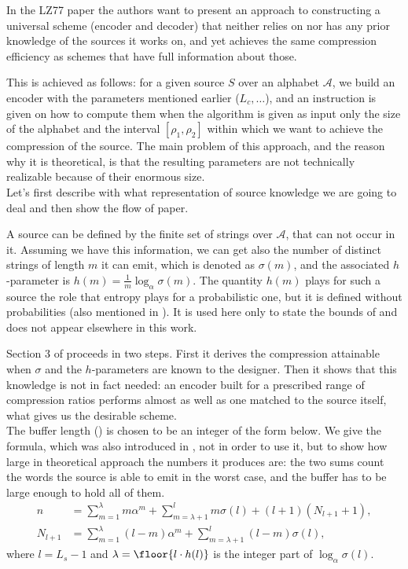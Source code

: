 In the LZ77 paper the authors want to present an approach to constructing a universal scheme (encoder and decoder) that neither relies on nor has any prior knowledge of the sources it works on, and yet achieves the same compression efficiency as schemes that have full information about those.

This is achieved as follows: for a given source \(S\) over an alphabet \(\mathcal{A}\), we build an encoder with the parameters mentioned earlier (\(L_c, \ldots\)), and an instruction is given on how to compute them when the algorithm is given as input only the size of the alphabet and the interval \([\rho_1, \rho_2]\) within which we want to achieve the compression of the source. The main problem of this approach, and the reason why it is theoretical, is that the resulting parameters are not technically realizable because of their enormous size.
\\

Let's first describe with what representation of source knowledge we are going to deal and then show the flow of \cite{ziv1977} paper.

A source can be defined by the finite set of strings over \(\mathcal{A}\), that can not occur in it. Assuming we have this information, we can get also the number of distinct strings of length \(m\) it can emit, which is denoted as \(\sigma(m)\), and the associated \(h\)-parameter is \(h(m) = \tfrac{1}{m} \log_\alpha \sigma(m)\). The quantity \(h(m)\) plays for such a source the role that entropy plays for a probabilistic one, but it is defined without probabilities (also mentioned in \cite{ziv1977}). It is used here only to state the bounds of \cite{ziv1977} and does not appear elsewhere in this work.

Section 3 of \cite{ziv1977} proceeds in two steps. First it derives the compression attainable when \(\sigma\) and the \(h\)-parameters are known to the designer. Then it shows that this knowledge is not in fact needed: an encoder built for a prescribed range of compression ratios performs almost as well as one matched to the source itself, what gives us the desirable scheme.
\\

The buffer length () is chosen to be an integer of the form below. We give the formula, which was also introduced in \cite{ziv1977}, not in order to use it, but to show how large in theoretical approach the numbers it produces are: the two sums count the words the source is able to emit in the worst case, and the buffer has to be large enough to hold all of them.
\begin{align}
\label{eq:buffer-length}
    n &= \sum_{m=1}^{\lambda} m \alpha^m
     + \sum_{m=\lambda+1}^{l} m \sigma(l)
     + (l + 1)(N_{l+1} + 1), \\
\label{eq:N-theor}
     N_{l+1} &= \sum_{m=1}^{\lambda} (l - m) \alpha^m
     + \sum_{m=\lambda+1}^{l} (l - m) \sigma(l),
\end{align}
where \(l = L_s - 1\) and \(\lambda = \floor{l \cdot h(l)}\) is the integer part of \(\log_\alpha \sigma(l)\). 

